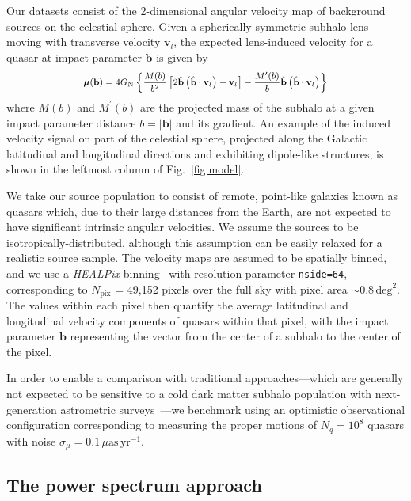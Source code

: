 \documentclass[twocolumn,linenumbers]{aastex631}
\newcommand{\package}[1]{\textsl{#1}\xspace}
\newcommand{\healpix}{\package{HEALPix}}
\begin{document}
Our datasets consist of the 2-dimensional angular velocity map of background sources on the celestial sphere. 
Given a spherically-symmetric subhalo lens moving with transverse velocity $\mathbf{v}_{l}$, the expected lens-induced velocity for a quasar at impact parameter $\mathbf{b}$ is given by~\citep{VanTilburg:2018ykj}
\begin{equation}
\footnotesize
\boldsymbol{\mu}(\mathbf{b})=4 G_{\mathrm{N}}\left\{\frac{M(b)}{b^{2}}\left[2 \hat{\mathbf{b}}\left(\hat{\mathbf{b}} \cdot \mathbf{v}_{l}\right)-\mathbf{v}_{l}\right]-\frac{M^{\prime}(b)}{b} \hat{\mathbf{b}}\left(\hat{\mathbf{b}} \cdot \mathbf{v}_{l}\right)\right\}
\end{equation}
where $M(b)$ and $M^{\prime}(b)$ are the projected mass of the subhalo at a given impact parameter distance $b = |\mathbf{b}|$ and its gradient. An example of the induced velocity signal on part of the celestial sphere, projected along the Galactic latitudinal and longitudinal directions and exhibiting dipole-like structures, is shown in the leftmost column of Fig.~\ref{fig:model}.

We take our source population to consist of remote, point-like galaxies known as quasars which, due to their large distances from the Earth, are not expected to have significant intrinsic angular velocities. We assume the sources to be isotropically-distributed, although this assumption can be easily relaxed for a realistic source sample. The velocity maps are assumed to be spatially binned, and we use  a \healpix binning~\citep{Gorski:2004by} with resolution parameter \texttt{nside=64}, corresponding to $N_\mathrm{pix}$ = 49,152 pixels over the full sky with pixel area $\sim 0.8\,\mathrm{deg}^2$. The values within each pixel then quantify the average latitudinal and longitudinal velocity components of quasars within that pixel, with the impact parameter $\mathbf b$ representing the vector from the center of a subhalo to the center of the pixel.

In order to enable a comparison with traditional approaches---which are generally not expected to be sensitive to a cold dark matter subhalo population with next-generation astrometric surveys~\citep{VanTilburg:2018ykj,Mishra-Sharma:2020ynk}---we benchmark using an optimistic observational configuration corresponding to measuring the proper motions of $N_q = 10^8$ quasars with noise $\sigma_{\mu} = 0.1\,\mu\mathrm{as}\,\mathrm{yr}^{-1}$.

\subsection{The power spectrum approach} 
\end{document}
